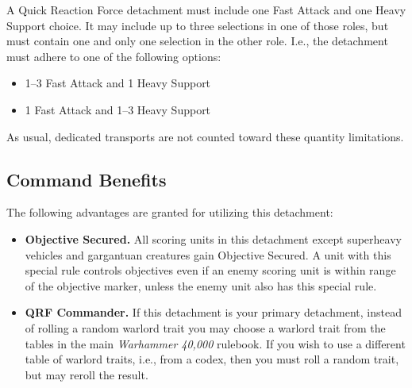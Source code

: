 A Quick Reaction Force detachment must include one Fast Attack and one
Heavy Support choice. It may include up to three selections in one of
those roles, but must contain one and only one selection in the other
role. I.e., the detachment must adhere to one of the following
options:

\begin{itemize}
\item 1--3 Fast Attack and 1 Heavy Support
\item 1 Fast Attack and 1--3 Heavy Support
\end{itemize}

As usual, dedicated transports are not counted toward these quantity limitations.

\subsection{Command Benefits}

The following advantages are granted for utilizing this detachment:

\begin{itemize}
\item \textbf{Objective Secured.} All scoring units in this detachment
  except superheavy vehicles and gargantuan creatures gain Objective
  Secured. A unit with this special rule controls objectives even if
  an enemy scoring unit is within range of the objective marker,
  unless the enemy unit also has this special rule.

\item \textbf{QRF Commander.} If this detachment is your primary
  detachment, instead of rolling a random warlord trait you may choose
  a warlord trait from the tables in the main \emph{Warhammer 40,000}
  rulebook.  If you wish to use a different table of warlord traits,
  i.e., from a codex, then you must roll a random trait, but may
  reroll the result.

\end{itemize}
